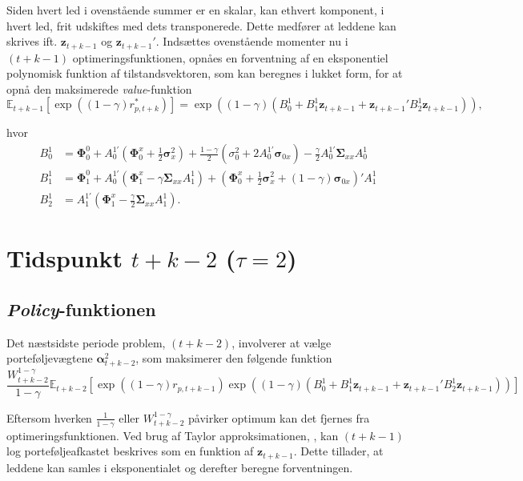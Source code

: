 \documentclass[
  a4paper,
  oneside]{memoir}
\begin{document}
Siden hvert led i ovenstående summer er en skalar, kan ethvert komponent, i hvert led, frit udskiftes med dets transponerede. Dette medfører at leddene kan skrives ift. \(\bm{z}_{t+k-1}\) og \(\bm{z}_{t+k-1}'\). Indsættes ovenstående momenter nu i \((t+k-1)\) optimeringsfunktionen, opnåes en forventning af en eksponentiel polynomisk funktion af tilstandsvektoren, som kan beregnes i lukket form, for at opnå den maksimerede \emph{value}-funktion
\[\mathbb{E}_{t+k-1}[\exp((1-\gamma)r_{p,t+k}^*)] = \exp\left((1-\gamma) (B_0^1 + B_1^1 \bm{z}_{t+k-1}+\bm{z}_{t+k-1}'B_2^1 \bm{z}_{t+k-1})\right),\]

hvor
\begin{align*}
B_0^1&=\bm{\Phi}_0^0 + A_0^{1\prime} (\bm{\Phi}_0^x + \frac{1}{2} \bm{\sigma}_x^2) + \frac{1-\gamma}{2}(\sigma_0^2 + 2 A_0^{1\prime} \bm{\sigma}_{0x}) - \frac{\gamma}{2} A_0^{1\prime} \bm{\Sigma}_{xx} A_0^1\\
B_1^1&=\bm{\Phi}_1^0 + A_0^{1\prime}(\bm{\Phi}_1^x - \gamma \bm{\Sigma}_{xx} A_1^1) + (\bm{\Phi}_{0}^x + \frac{1}{2} \bm{\sigma}_x^2 + (1-\gamma)\bm{\sigma}_{0x})' A_1^1\\
B_2^1&=A_1^{1\prime} (\bm{\Phi}_1^x - \frac{\gamma}{2} \bm{\Sigma}_{xx} A_1^1).
\end{align*}

\hypertarget{tidspunkt-tk-2-tau2}{%
\section{\texorpdfstring{Tidspunkt \(t+k-2\) (\(\tau=2\))}{Tidspunkt t+k-2 (\textbackslash tau=2)}}\label{tidspunkt-tk-2-tau2}}

\hypertarget{policy-funktionen-1}{%
\subsection{\texorpdfstring{\emph{Policy}-funktionen}{Policy-funktionen}}\label{policy-funktionen-1}}

Det næstsidste periode problem, \((t+k-2)\), involverer at vælge porteføljevægtene \(\bm{\alpha}_{t+k-2}^2\), som maksimerer den følgende funktion
\[\frac{W_{t+k-2}^{1-\gamma}}{1-\gamma} \mathbb{E}_{t+k-2}[\exp((1-\gamma) r_{p,t+k-1}) \exp((1-\gamma) (B_0^1 + B_1^1 \bm{z}_{t+k-1} + \bm{z}_{t+k-1}' B_2^1\bm{z}_{t+k-1}))]\]

Eftersom hverken \(\tfrac{1}{1-\gamma}\) eller \(W_{t+k-2}^{1-\gamma}\) påvirker optimum kan det fjernes fra optimeringsfunktionen. Ved brug af Taylor approksimationen, \citep{CampVicCha2003}, kan \((t+k-1)\) log porteføljeafkastet beskrives som en funktion af \(\bm{z}_{t+k-1}\). Dette tillader, at leddene kan samles i eksponentialet og derefter beregne forventningen.
\end{document}
